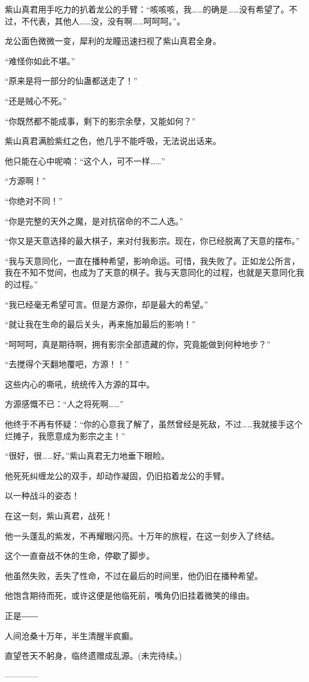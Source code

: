 \begin{this_body}
紫山真君用手吃力的扒着龙公的手臂：“咳咳咳，我……的确是……没有希望了。不过，不代表，其他人……没，没有啊……呵呵呵。”。

龙公面色微微一变，犀利的龙瞳迅速扫视了紫山真君全身。

“难怪你如此不堪。”

“原来是将一部分的仙蛊都送走了！”

“还是贼心不死。”

“你既然都不能成事，剩下的影宗余孽，又能如何？”

紫山真君满脸紫红之色，他几乎不能呼吸，无法说出话来。

他只能在心中呢喃：“这个人，可不一样……”

“方源啊！”

“你绝对不同！”

“你是完整的天外之魔，是对抗宿命的不二人选。”

“你又是天意选择的最大棋子，来对付我影宗。现在，你已经脱离了天意的摆布。”

“我与天意同化，一直在播种希望，影响命运。可惜，我失败了。正如龙公所言，我在不知不觉间，也成为了天意的棋子。我与天意同化的过程，也就是天意同化我的过程。”

“我已经毫无希望可言。但是方源你，却是最大的希望。”

“就让我在生命的最后关头，再来施加最后的影响！”

“呵呵呵，真是期待啊，拥有影宗全部遗藏的你，究竟能做到何种地步？”

“去搅得个天翻地覆吧，方源！！”

这些内心的嘶吼，统统传入方源的耳中。

方源感慨不已：“人之将死啊……”

他终于不再有怀疑：“你的心意我了解了，虽然曾经是死敌，不过……我就接手这个烂摊子，我愿意成为影宗之主！”

“很好，很……好。”紫山真君无力地垂下眼睑。

他死死纠缠龙公的双手，却动作凝固，仍旧掐着龙公的手臂。

以一种战斗的姿态！

在这一刻，紫山真君，战死！

他一头蓬乱的紫发，不再耀眼闪亮。十万年的旅程，在这一刻步入了终结。

这个一直奋战不休的生命，停歇了脚步。

他虽然失败，丢失了性命，不过在最后的时间里，他仍旧在播种希望。

他饱含期待而死，或许这便是他临死前，嘴角仍旧挂着微笑的缘由。

正是――

人间沧桑十万年，半生清醒半疯癫。

直望苍天不躬身，临终遗赠成乱源。(未完待续。)

------------

\end{this_body}

